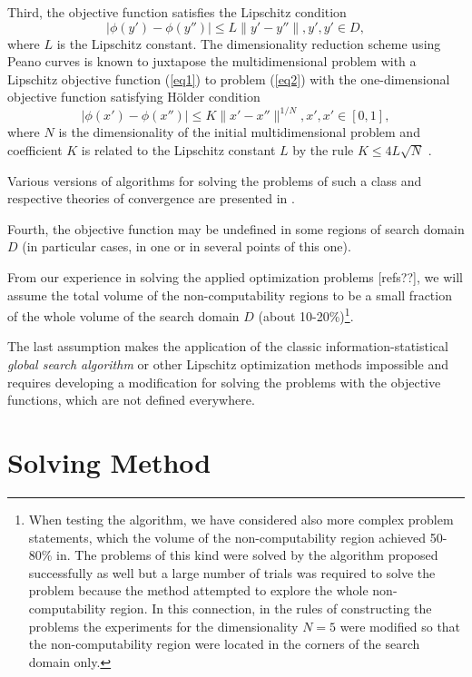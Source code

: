 \documentclass[runningheads]{llncs}
\begin{document}
Third, the objective function satisfies the Lipschitz condition
\begin{equation}\label{eq3} 
| \phi (y')-\phi (y'') | \leq L \| y'-y'' \|, y',y' \in D,
\end{equation}
where $L$ is the Lipschitz constant. The dimensionality reduction scheme using Peano curves is known to juxtapose the multidimensional problem with a Lipschitz objective function (\ref{eq1}) to problem (\ref{eq2}) with the one-dimensional objective function satisfying H{\"o}lder condition
\begin{equation}\label{eq4} 
| \phi (x')-\phi (x'') | \leq K \| x'-x'' \| ^{1/N}, x',x' \in [0,1],
\end{equation}
where $N$ is the dimensionality of the initial multidimensional problem and coefficient $K$ is related to the Lipschitz constant $L$ by the rule $K \leq 4L\sqrt N$ \cite{Strongin2000}.

Various versions of algorithms for solving the problems of such a class and respective theories of convergence are presented in \cite{Gourdin1996,Lera2015,strongin1978}.

Fourth, the objective function may be undefined in some regions of search domain $D$ (in particular cases, in one or in several points of this one).

From our experience in solving the applied optimization problems [refs??], we will assume the total volume of the non-computability regions to be a small fraction of the whole volume of the search domain $D$ (about 10-20\%)\footnote{When testing the algorithm, we have considered also more complex problem statements, which the volume of the non-computability region achieved 50-80\% in. The problems of this kind were solved by the algorithm proposed successfully as well but a large number of trials was required to solve the problem because the method attempted to explore the whole non-computability region. In this connection, in the rules of constructing the problems the experiments for the dimensionality $N=5$ were modified so that the non-computability region were located in the corners of the search domain only.}.

The last assumption makes the application of the classic information-statistical \textit{global search algorithm} \cite{indexMethod,strongin1978} or other Lipschitz optimization methods impossible and requires developing a modification for solving the problems with the objective functions, which are not defined everywhere.

\section{Solving Method}
\end{document}
